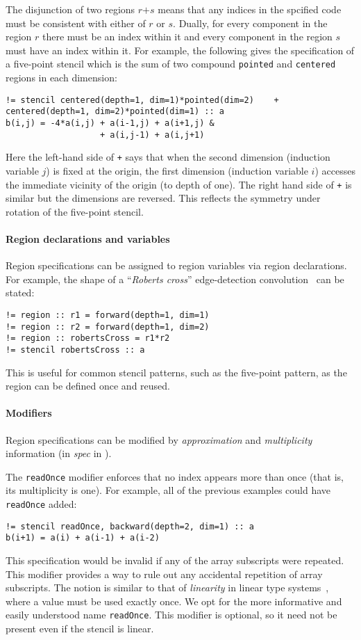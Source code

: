 \documentclass[10pt,preprint]{sigplanconf}
\theoremstyle{definition}
\newcommand{\term}[1]{\texttt{#1}}
\begin{document}
The disjunction of two regions $r \term{+} s$ means that any indices
in the spcified code must be consistent with either of $r$ or $s$.
Dually, for every component in the region $r$ there must be an index
within it and every component in the region $s$ must have an index
within it. For
example, the following gives the specification of a five-point
stencil which is the sum of two compound \texttt{pointed} and
\texttt{centered} regions in each dimension:
%
\begin{verbatim}
!= stencil centered(depth=1, dim=1)*pointed(dim=2)    + centered(depth=1, dim=2)*pointed(dim=1) :: a
b(i,j) = -4*a(i,j) + a(i-1,j) + a(i+1,j) &
                   + a(i,j-1) + a(i,j+1)
\end{verbatim}
Here the left-hand side of \texttt{+} says that when the second dimension
(induction variable $j$) is fixed at the origin, the first dimension
(induction variable $i$) accesses the immediate vicinity of the origin
(to depth of one). The right hand side of \texttt{+} is similar but the dimensions are reversed.
This reflects the symmetry under rotation of the five-point stencil.

\paragraph{Region declarations and variables}

Region specifications can be assigned to region variables via
region declarations. For example, the shape of a
``\emph{Roberts cross}'' edge-detection convolution~\cite{davis1975survey}
can be stated:
\begin{verbatim}
!= region :: r1 = forward(depth=1, dim=1)
!= region :: r2 = forward(depth=1, dim=2)
!= region :: robertsCross = r1*r2
!= stencil robertsCross :: a
\end{verbatim}
This is useful for common stencil patterns, such as the five-point
pattern, as the region can be defined once and reused.
\paragraph{Modifiers}
Region specifications can be modified
by \emph{approximation} and \emph{multiplicity} information
(in \textit{spec} in ).

The \texttt{readOnce} modifier enforces that no index appears more
than once (that is, its multiplicity is one). For example, all of
the previous examples could have \texttt{readOnce} added:
%
\begin{verbatim}
!= stencil readOnce, backward(depth=2, dim=1) :: a
b(i+1) = a(i) + a(i-1) + a(i-2)
\end{verbatim}
%
This specification would be invalid if any of the
array subscripts were repeated. This modifier provides a way to
rule out any accidental repetition of array subscripts.
The notion is similar to that of \emph{linearity} in linear type
systems~\cite{wadler1990linear}, where a value must be used
exactly once. We opt for the more informative and easily understood name
\texttt{readOnce}. This modifier is optional, so it need not
be present even if the stencil is linear.
\end{document}
